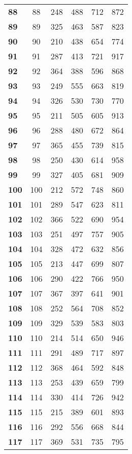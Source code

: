 \begin{longtable}{|l|c|c|c|c|c|}
    \textbf{88} & 88 &248 & 488 & 712 & 872 \\
    \textbf{89} & 89 &325 & 463 & 587 & 823 \\
    \textbf{90} & 90 &210 & 438 & 654 & 774 \\
    \textbf{91} & 91 &287 & 413 & 721 & 917 \\
    \textbf{92} & 92 &364 & 388 & 596 & 868 \\
    \textbf{93} & 93 &249 & 555 & 663 & 819 \\
    \textbf{94} & 94 &326 & 530 & 730 & 770 \\
    \textbf{95} & 95 &211 & 505 & 605 & 913 \\
    \textbf{96} & 96 &288 & 480 & 672 & 864 \\
    \textbf{97} & 97 &365 & 455 & 739 & 815 \\
    \textbf{98} & 98 &250 & 430 & 614 & 958 \\
    \textbf{99} & 99 &327 & 405 & 681 & 909 \\
    \textbf{100} & 100 &212 & 572 & 748 & 860 \\
    \textbf{101} & 101 &289 & 547 & 623 & 811 \\
    \textbf{102} & 102 &366 & 522 & 690 & 954 \\
    \textbf{103} & 103 &251 & 497 & 757 & 905 \\
    \textbf{104} & 104 &328 & 472 & 632 & 856 \\
    \textbf{105} & 105 &213 & 447 & 699 & 807 \\
    \textbf{106} & 106 &290 & 422 & 766 & 950 \\
    \textbf{107} & 107 &367 & 397 & 641 & 901 \\
    \textbf{108} & 108 &252 & 564 & 708 & 852 \\
    \textbf{109} & 109 &329 & 539 & 583 & 803 \\
    \textbf{110} & 110 &214 & 514 & 650 & 946 \\
    \textbf{111} & 111 &291 & 489 & 717 & 897 \\
    \textbf{112} & 112 &368 & 464 & 592 & 848 \\
    \textbf{113} & 113 &253 & 439 & 659 & 799 \\
    \textbf{114} & 114 &330 & 414 & 726 & 942 \\
    \textbf{115} & 115 &215 & 389 & 601 & 893 \\
    \textbf{116} & 116 &292 & 556 & 668 & 844 \\
    \textbf{117} & 117 &369 & 531 & 735 & 795 \\

\end{longtable}
